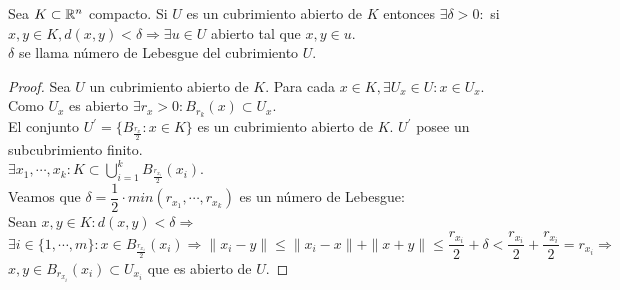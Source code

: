 \begin{prop}
  Sea \(K \subset \mathbb{R}^n\) compacto. Si \(U\) es un cubrimiento abierto de \(K\) entonces \(\exists \delta > 0 :\) si \(x, y \in K, d(x, y) < \delta \Rightarrow \exists u \in U\) abierto tal que \(x, y \in u\). \\
  \(\delta\) se llama número de Lebesgue del cubrimiento \(U\).
  \begin{proof}
    Sea \(U\) un cubrimiento abierto de \(K\). Para cada \(x \in K, \exists U_x \in U : x \in U_x\). Como \(U_x\) es abierto \(\exists r_x > 0 : B_{r_k}(x) \subset U_x\). \\
    El conjunto \(U^{\prime} = \{ B_{\frac{r_x}{2}} : x \in K \}\) es un cubrimiento abierto de \(K\). \(U^{\prime}\) posee un subcubrimiento finito. \\
    \(\exists x_1, \cdots, x_k : K \subset \bigcup_{i = 1}^{k} B_{\frac{r_{x_i}}{2}}(x_i)\). \\
    Veamos que \(\delta = \dfrac{1}{2} \cdot min(r_{x_1}, \cdots, r_{x_k})\) es un número de Lebesgue: \\
    Sean \(x, y \in K : d(x,y) < \delta \Rightarrow\) \\
    \(\exists i \in \{1, \cdots, m\} : x \in B_{\frac{r_{x_i}}{2}}(x_i) \Rightarrow \|x_i - y\| \leq \|x_i - x\| + \|x+y\| \leq \dfrac{r_{x_i}}{2} + \delta < \dfrac{r_{x_i}}{2} + \dfrac{r_{x_i}}{2} = r_{x_i} \Rightarrow\) \\
    \(x, y \in B_{r_{x_i}}(x_i) \subset U_{x_i}\) que es abierto de \(U\).
  \end{proof}
\end{prop}